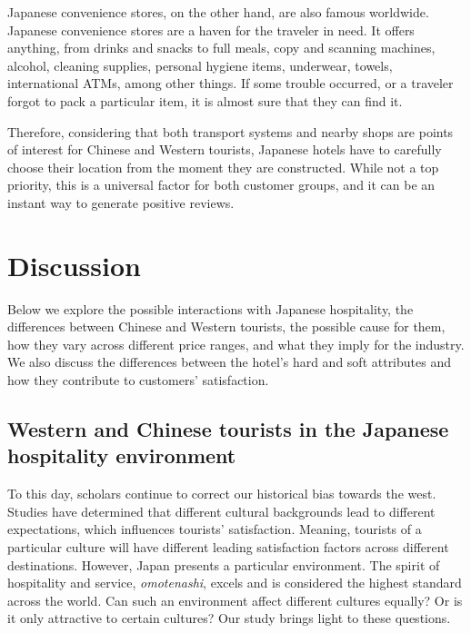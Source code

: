 \documentclass[smallextended,natbib]{svjour3}       %
\begin{document}
    Japanese convenience stores, on the other hand, are also famous worldwide. Japanese convenience stores are a haven for the traveler in need. It offers anything, from drinks and snacks to full meals, copy and scanning machines, alcohol, cleaning supplies, personal hygiene items, underwear, towels, international ATMs, among other things. If some trouble occurred, or a traveler forgot to pack a particular item, it is almost sure that they can find it. 

    Therefore, considering that both transport systems and nearby shops are points of interest for Chinese and Western tourists, Japanese hotels have to carefully choose their location from the moment they are constructed. While not a top priority, this is a universal factor for both customer groups, and it can be an instant way to generate positive reviews.

\section{Discussion}\label{discussion}

  Below we explore the possible interactions with Japanese hospitality, the differences between Chinese and Western tourists, the possible cause for them, how they vary across different price ranges, and what they imply for the industry. We also discuss the differences between the hotel's hard and soft attributes and how they contribute to customers' satisfaction.

  \subsection{Western and Chinese tourists in the Japanese hospitality environment}\label{disc:omotenashi}

    To this day, scholars continue to correct our historical bias towards the west. Studies have determined that different cultural backgrounds lead to different expectations, which influences tourists' satisfaction. Meaning, tourists of a particular culture will have different leading satisfaction factors across different destinations. However, Japan presents a particular environment. The spirit of hospitality and service, \textit{omotenashi}, excels and is considered the highest standard across the world. Can such an environment affect different cultures equally? Or is it only attractive to certain cultures? Our study brings light to these questions.
\end{document}
